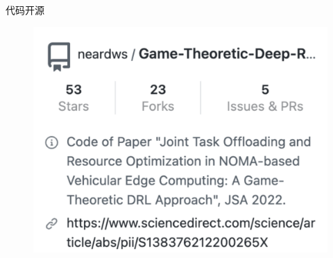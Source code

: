 \begin{frame}{代码开源}
\begin{minipage}[t]{0.3\textwidth}
\begin{figure}
\end{figure}
\begin{figure}
  \centering
  \includegraphics[width=1\textwidth]{fig/github_gtdrl.pdf}
\end{figure}
\end{minipage}	
\end{frame}

